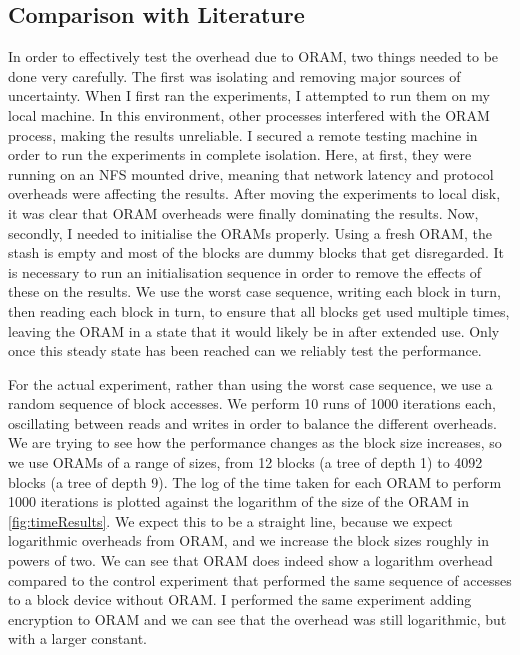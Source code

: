 \documentclass[12pt,a4paper,twoside,openright]{report}
\begin{document}
\subsection{Comparison with Literature}
\label{subsec:comparisonWithLiterature}

In order to effectively test the overhead due to ORAM, two things needed to be done very carefully. The first was isolating and removing major sources of uncertainty. When I first ran the experiments, I attempted to run them on my local machine. In this environment, other processes interfered with the ORAM process, making the results unreliable. I secured a remote testing machine in order to run the experiments in complete isolation. Here, at first, they were running on an NFS mounted drive, meaning that network latency and protocol overheads were affecting the results. After moving the experiments to local disk, it was clear that ORAM overheads were finally dominating the results. Now, secondly, I needed to initialise the ORAMs properly. Using a fresh ORAM, the stash is empty and most of the blocks are dummy blocks that get disregarded. It is necessary to run an initialisation sequence in order to remove the effects of these on the results. We use the worst case sequence, writing each block in turn, then reading each block in turn, to ensure that all blocks get used multiple times, leaving the ORAM in a state that it would likely be in after extended use. Only once this steady state has been reached can we reliably test the performance.

For the actual experiment, rather than using the worst case sequence, we use a random sequence of block accesses. We perform 10 runs of 1000 iterations each, oscillating between reads and writes in order to balance the different overheads. We are trying to see how the performance changes as the block size increases, so we use ORAMs of a range of sizes, from 12 blocks (a tree of depth 1) to 4092 blocks (a tree of depth 9). The log of the time taken for each ORAM to perform 1000 iterations is plotted against the logarithm of the size of the ORAM in \cref{fig:timeResults}. We expect this to be a straight line, because we expect logarithmic overheads from ORAM, and we increase the block sizes roughly in powers of two. We can see that ORAM does indeed show a logarithm overhead compared to the control experiment that performed the same sequence of accesses to a block device without ORAM. I performed the same experiment adding encryption to ORAM and we can see that the overhead was still logarithmic, but with a larger constant.
\end{document}
